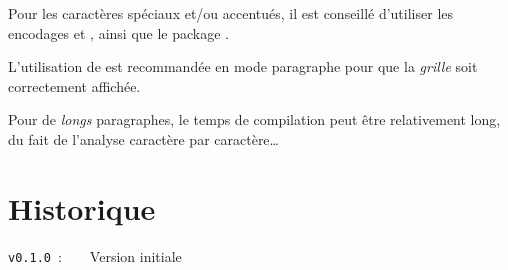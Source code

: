 \documentclass[french,11pt,a4paper]{article}
\begin{document}
Pour les caractères spéciaux et/ou accentués, il est conseillé d'utiliser les encodages  et , ainsi que le package .

\smallskip

L'utilisation de  est recommandée en mode paragraphe pour que la \textit{grille} soit correctement affichée.

Pour de \textit{longs} paragraphes, le temps de compilation peut être relativement long, du fait de l'analyse caractère par caractère\ldots

\section{Historique}

\verb|v0.1.0|~:~~~~Version initiale

\vspace*{1cm}
\end{document}
